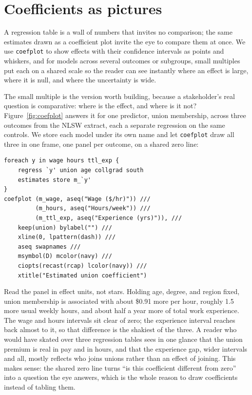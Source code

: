 \documentclass[
    a4paper,
    fontsize=10pt,
    twoside=true,
    numbers=noenddot,
]{kaobook}
\begin{document}
\section{Coefficients as pictures}
A regression table is a wall of numbers that invites no comparison; the same estimates drawn as a coefficient plot invite the eye to compare them at once. We use \texttt{coefplot} to show effects with their confidence intervals as points and whiskers, and for models across several outcomes or subgroups, small multiples put each on a shared scale so the reader can see instantly where an effect is large, where it is null, and where the uncertainty is wide.

The small multiple is the version worth building, because a stakeholder's real question is comparative: where is the effect, and where is it not? Figure~\ref{fig:coefplot} answers it for one predictor, union membership, across three outcomes from the NLSW extract, each a separate regression on the same controls. We store each model under its own name and let \texttt{coefplot} draw all three in one frame, one panel per outcome, on a shared zero line:
{\footnotesize
\begin{verbatim}
foreach y in wage hours ttl_exp {
    regress `y' union age collgrad south
    estimates store m_`y'
}
coefplot (m_wage, aseq("Wage ($/hr)")) ///
         (m_hours, aseq("Hours/week")) ///
         (m_ttl_exp, aseq("Experience (yrs)")), ///
    keep(union) bylabel("") ///
    xline(0, lpattern(dash)) ///
    aseq swapnames ///
    msymbol(D) mcolor(navy) ///
    ciopts(recast(rcap) lcolor(navy)) ///
    xtitle("Estimated union coefficient")
\end{verbatim}
}
Read the panel in effect units, not stars. Holding age, degree, and region fixed, union membership is associated with about \$0.91 more per hour, roughly 1.5 more usual weekly hours, and about half a year more of total work experience. The wage and hours intervals sit clear of zero; the experience interval reaches back almost to it, so that difference is the shakiest of the three. A reader who would have skated over three regression tables sees in one glance that the union premium is real in pay and in hours, and that the experience gap, wider intervals and all, mostly reflects who joins unions rather than an effect of joining. This makes sense: the shared zero line turns \enquote{is this coefficient different from zero} into a question the eye answers, which is the whole reason to draw coefficients instead of tabling them.
\end{document}
